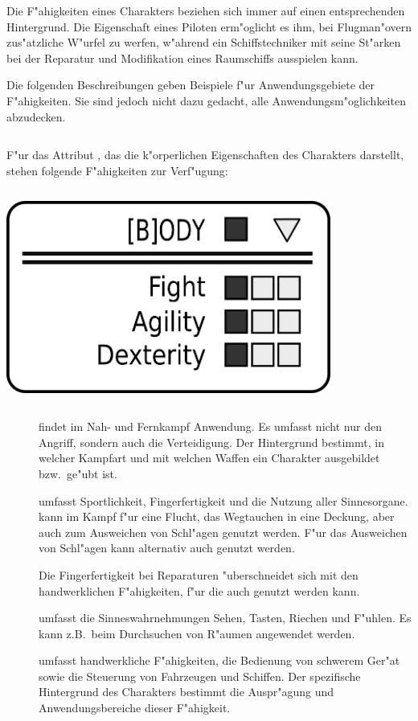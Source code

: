 Die F"ahigkeiten eines Charakters beziehen sich immer auf einen entsprechenden Hintergrund. Die Eigenschaft  eines Piloten erm"oglicht es ihm, bei Flugman"overn zus"atzliche W"urfel zu werfen, w"ahrend ein Schiffstechniker mit  seine St"arken bei der Reparatur und Modifikation eines Raumschiffs ausspielen kann.

Die folgenden Beschreibungen geben Beispiele f"ur Anwendungsgebiete der F"ahigkeiten. Sie sind jedoch nicht dazu gedacht, alle Anwendungsm"oglichkeiten abzudecken.

\medskip
\begin{column}[l]{0.55}
    F"ur das Attribut , das die k"orperlichen Eigenschaften des Charakters darstellt, stehen folgende F"ahigkeiten zur Verf"ugung:
\end{column}
\begin{column}[r]{0.45}
    \centering
    \includegraphics[width=0.80\textwidth]{images/character_body.png}
\end{column}

\begin{description}
    \item[]  findet im Nah- und Fernkampf Anwendung. Es umfasst nicht nur den Angriff, sondern auch die 
        Verteidigung. Der Hintergrund bestimmt, in welcher Kampfart und mit welchen Waffen ein Charakter ausgebildet bzw.~ge"ubt ist.
    \item[]  umfasst Sportlichkeit, Fingerfertigkeit und die Nutzung aller Sinnesorgane.  kann 
        im Kampf f"ur eine Flucht, das Wegtauchen in eine Deckung, aber auch zum Ausweichen von Schl"agen genutzt werden. F"ur das Ausweichen von Schl"agen kann alternativ auch  genutzt werden.

        Die Fingerfertigkeit bei Reparaturen "uberschneidet sich mit den handwerklichen F"ahigkeiten, f"ur die auch  genutzt werden kann.
    
         umfasst die Sinneswahrnehmungen Sehen, Tasten, Riechen und F"uhlen. Es kann z.B.~beim Durchsuchen von R"aumen angewendet werden. 
    \item[]  umfasst handwerkliche F"ahigkeiten, die Bedienung von schwerem Ger"at sowie die Steuerung von 
        Fahrzeugen und Schiffen. Der spezifische Hintergrund des Charakters bestimmt die Auspr"agung und Anwendungsbereiche dieser F"ahigkeit.
\end{description}

